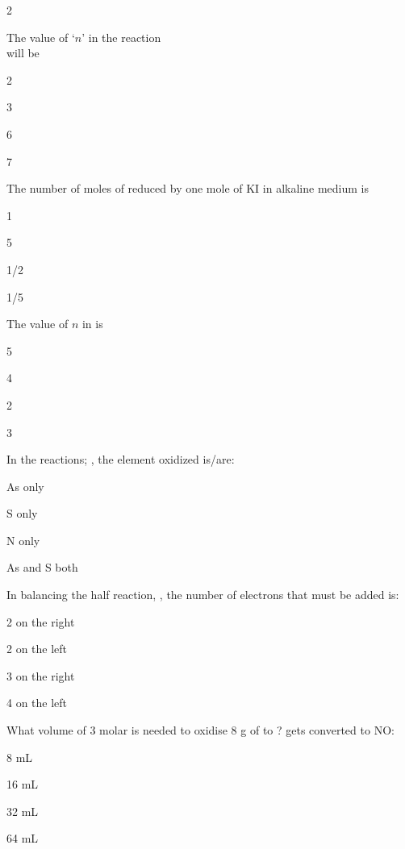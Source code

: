\documentclass[10pt,a4paper]{article}
\begin{document}
\begin{multicols}{2}
\begin{questions}[start=107]
\item The value of `$n$' in the reaction\\
 will be
\begin{options}
  \item 2
  \item 3
  \item 6
  \item 7
\end{options}

\item The number of moles of  reduced by one mole of KI in alkaline medium is
\begin{options}
  \item 1
  \item 5
  \item 1/2
  \item 1/5
\end{options}

\item The value of $n$ in  is
\begin{options}
  \item 5
  \item 4
  \item 2
  \item 3
\end{options}

\item In the reactions; , the element oxidized is/are:
\begin{options}
  \item As only
  \item S only
  \item N only
  \item As and S both
\end{options}

\item In balancing the half reaction, , the number of electrons that must be added is:
\begin{options}
  \item 2 on the right
  \item 2 on the left
  \item 3 on the right
  \item 4 on the left
\end{options}

\item What volume of 3 molar  is needed to oxidise 8 g of  to ?  gets converted to NO:
\begin{options}
  \item 8 mL
  \item 16 mL
  \item 32 mL
  \item 64 mL
\end{options}


\end{questions}
\end{multicols}
\end{document}
